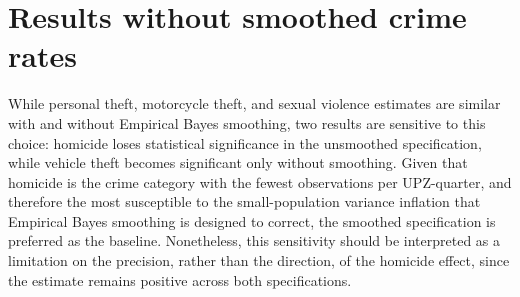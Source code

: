 \documentclass[12pt]{article}
\begin{document}
\section{Results without smoothed crime rates}
\label{sec:no_smooth}

While personal theft, motorcycle theft, and sexual violence estimates are similar with and without Empirical Bayes smoothing, two results are sensitive to this choice: homicide loses statistical significance in the unsmoothed specification, while vehicle theft becomes significant only without smoothing. Given that homicide is the crime category with the fewest observations per UPZ-quarter, and therefore the most susceptible to the small-population variance inflation that Empirical Bayes smoothing is designed to correct, the smoothed specification is preferred as the baseline. Nonetheless, this sensitivity should be interpreted as a limitation on the precision, rather than the direction, of the homicide effect, since the estimate remains positive across both specifications.
\end{document}
